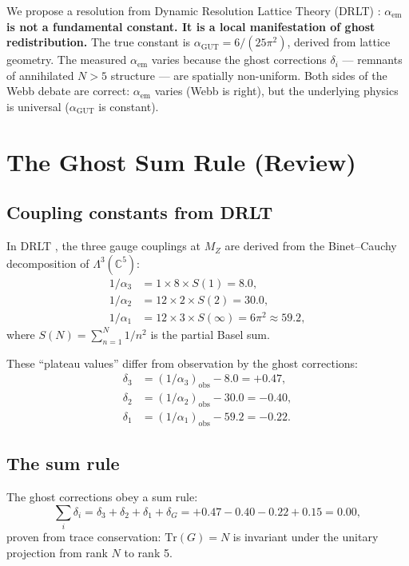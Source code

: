 \documentclass[12pt]{article}
\theoremstyle{remark}
\begin{document}
We propose a resolution from Dynamic Resolution Lattice Theory (DRLT) \cite{DRLT}: \textbf{$\alpha_\text{em}$ is not a fundamental constant. It is a local manifestation of ghost redistribution.} The true constant is $\alpha_\text{GUT} = 6/(25\pi^2)$, derived from lattice geometry. The measured $\alpha_\text{em}$ varies because the ghost corrections $\delta_i$ --- remnants of annihilated $N > 5$ structure --- are spatially non-uniform. Both sides of the Webb debate are correct: $\alpha_\text{em}$ varies (Webb is right), but the underlying physics is universal ($\alpha_\text{GUT}$ is constant).

\section{The Ghost Sum Rule (Review)}

\subsection{Coupling constants from DRLT}

In DRLT \cite{DRLT}, the three gauge couplings at $M_Z$ are derived from the Binet--Cauchy decomposition of $\Lambda^3(\mathbb{C}^5)$:
\begin{align}
1/\alpha_3 &= 1 \times 8 \times S(1) = 8.0, \\
1/\alpha_2 &= 12 \times 2 \times S(2) = 30.0, \\
1/\alpha_1 &= 12 \times 3 \times S(\infty) = 6\pi^2 \approx 59.2,
\end{align}
where $S(N) = \sum_{n=1}^{N} 1/n^2$ is the partial Basel sum.

These ``plateau values'' differ from observation by the ghost corrections:
\begin{align}
\delta_3 &= (1/\alpha_3)_\text{obs} - 8.0 = +0.47, \\
\delta_2 &= (1/\alpha_2)_\text{obs} - 30.0 = -0.40, \\
\delta_1 &= (1/\alpha_1)_\text{obs} - 59.2 = -0.22.
\end{align}

\subsection{The sum rule}

The ghost corrections obey a sum rule:
\begin{equation}
\sum_i \delta_i = \delta_3 + \delta_2 + \delta_1 + \delta_G = +0.47 - 0.40 - 0.22 + 0.15 = 0.00,
\end{equation}
proven from trace conservation: $\text{Tr}(G) = N$ is invariant under the unitary projection from rank $N$ to rank 5.
\end{document}
